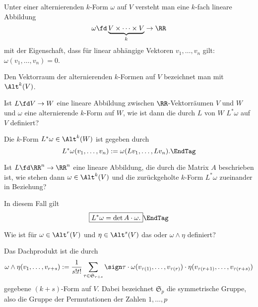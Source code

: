 \begin{antwort}
  Unter einer alternierenden $k$-Form $\omega$ auf $V$ 
  versteht man eine $k$-fach lineare Abbildung 
  \[ 
  \omega \fd \underbrace{V\times \cdots \times V}_k \to \RR
  \]
  mit der Eigenschaft, dass für linear abhängige Vektoren 
  $v_1,\ldots,v_n$ gilt: $\omega(v_1,\ldots,v_n)=0$. 

  Den Vektorraum der alternierenden $k$-Formen auf $V$ bezeichnet man mit 
  $\Alt^k(V)$. 
  \AntEnd  
\end{antwort}

\begin{frage}\label{12_zuruck}
  Ist $L\fd V \to W$ eine lineare Abbildung zwischen $\RR$-Vektorräumen 
  $V$ und $W$ und $\omega$ eine alternierende 
  $k$-Form auf $W$, wie ist dann die durch $L$ von $W$ 
   $L^*\omega$ auf $V$ definiert? 
\end{frage}

\begin{antwort}
  Die $k$-Form $L^*\omega \in \Alt^k(W)$ ist gegeben durch  
  \[
  L^*\omega (v_1,\ldots,v_n ):=\omega( Lv_1,\ldots,Lv_n).\EndTag
  \]
\end{antwort} 

\begin{frage}\label{12_zuruckdet}
  Ist $L\fd \RR^n\to \RR^n$ eine lineare Abbildung, die durch die 
  Matrix $A$ beschrieben ist, wie stehen dann 
  $\omega\in \Alt^k(V)$ und die zurückgeholte $k$-Form $L^*\omega$ 
  zueinander in Beziehung?   
\end{frage}

\begin{antwort}
  In diesem Fall gilt 
  \[
  \boxed{ L^* \omega = \det A \cdot \omega. } \EndTag
  \]
\end{antwort} 

\begin{frage}
  Wie ist für $\omega\in\Alt^r(V)$ und $\eta\in\Alt^s(V)$ das 
   oder 
   $\omega\wedge\eta$ definiert?
\end{frage}

\begin{antwort}
  Das Dachprodukt ist die durch
  \[
  \omega\wedge\eta (v_1,\ldots,v_{r+s}) := 
  \frac{1}{s!t!} \sum_{\tau\in\mathfrak{S}_{r+s}} \sign \tau 
  \cdot \omega( v_{\tau(1)},\ldots,v_{\tau(r)} )\cdot 
  \eta( v_{\tau(r+1)},\ldots,v_{\tau(r+s)} )
  \]
  gegebene $(k+s)$-Form auf $V$. 
  Dabei bezeichnet $\mathfrak{S}_p$ die symmetrische Gruppe, also die 
  Gruppe der Permutationen der Zahlen $1,\ldots,p$ 
  \AntEnd 
\end{antwort} 

